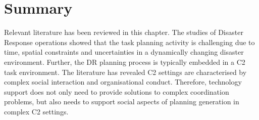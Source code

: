 

\section{Summary}
Relevant literature has been reviewed in this chapter. The studies of Disaster Response operations showed that the task planning activity is challenging due to time, spatial constraints and uncertainties in a dynamically changing disaster environment. Further, the \ac{DR} planning process is typically embedded in a \acf{C2} task environment. The literature has revealed \ac{C2} settings are characterised by complex social interaction and organisational conduct. Therefore, technology support does not only need to provide solutions to complex coordination problems, but also needs to support social aspects of planning generation in complex \ac{C2} settings. \\

